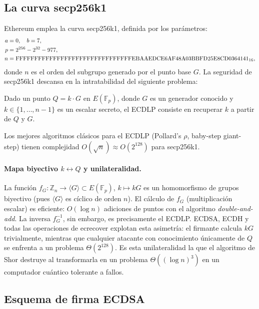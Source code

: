 \subsection{La curva secp256k1}

Ethereum emplea la curva secp256k1, definida por los parámetros:
\begin{align}
  a &= 0, \quad b = 7, \label{eq:secp256k1_params} \\
  p &= 2^{256} - 2^{32} - 977, \notag \\
  n &= \text{FFFFFFFFFFFFFFFFFFFFFFFFFFFFFFFEBAAEDCE6AF48A03BBFD25E8CD0364141}_{16}, \notag
\end{align}
donde $n$ es el orden del subgrupo generado por el punto base $G$. La seguridad de secp256k1 descansa en la intratabilidad del siguiente problema:

\begin{definicion}
\label{def:ecdlp}
Dado un punto $Q = k \cdot G$ en $E(\mathbb{F}_p)$, donde $G$ es un generador conocido y $k \in \{1, \ldots, n-1\}$ es un escalar secreto, el ECDLP consiste en recuperar $k$ a partir de $Q$ y $G$.
\end{definicion}

Los mejores algoritmos clásicos para el ECDLP (Pollard's $\rho$, baby-step giant-step) tienen complejidad $O(\sqrt{n}) \approx O(2^{128})$ para secp256k1.

\paragraph{Mapa biyectivo $k \leftrightarrow Q$ y unilateralidad.} La función $f_G: \mathbb{Z}_n \to \langle G \rangle \subset E(\mathbb{F}_p)$, $k \mapsto kG$ es un homomorfismo de grupos biyectivo (pues $\langle G \rangle$ es cíclico de orden $n$). El cálculo de $f_G$ (multiplicación escalar) es eficiente: $O(\log n)$ adiciones de puntos con el algoritmo \emph{double-and-add}. La inversa $f_G^{-1}$, sin embargo, es precisamente el ECDLP. ECDSA, ECDH y todas las operaciones de ecrecover explotan esta asimetría: el firmante calcula $kG$ trivialmente, mientras que cualquier atacante con conocimiento únicamente de $Q$ se enfrenta a un problema $\Theta(2^{128})$. Es esta unilateralidad la que el algoritmo de Shor destruye al transformarla en un problema $\Theta((\log n)^3)$ en un computador cuántico tolerante a fallos.

\subsection{Esquema de firma ECDSA}

